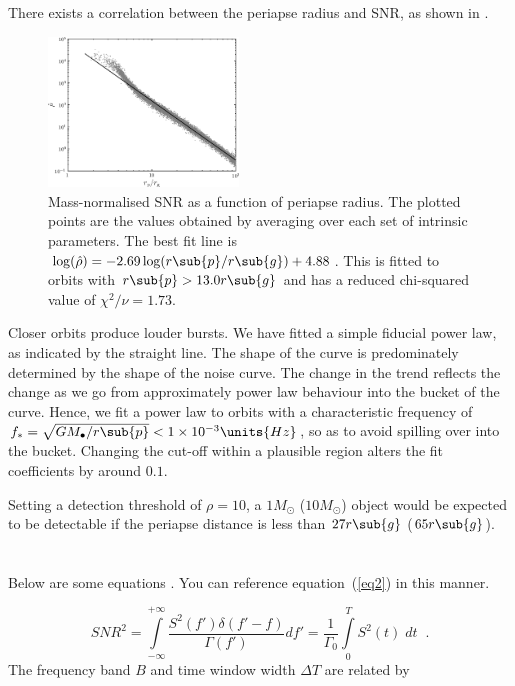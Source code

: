 \documentclass[11pt,twoside]{article}
\begin{document}
\begin{enumerate}
There exists a correlation between the periapse radius and SNR, as shown in .
\begin{figure}
  \begin{center}
  \includegraphics[width=0.45\textwidth]{Fig_SNR}
    \caption{Mass-normalised SNR as a function of periapse radius. The plotted points are the values obtained by averaging over each set of intrinsic parameters. The best fit line is $\log(\hat{\rho}) = -2.69\log(r\sub{p}/r\sub{g}) + 4.88$. This is fitted to orbits with $r\sub{p} >  13.0 r\sub{g}$ and has a reduced chi-squared value of $\chi^2/\nu = 1.73$.}
    \label{fig:SNR}
  \end{center}
\end{figure}
Closer orbits produce louder bursts. We have fitted a simple fiducial power law, as indicated by the straight line. The shape of the curve is predominately determined by the shape of the noise curve. The change in the trend reflects the change as we go from approximately power law behaviour into the bucket of the curve. Hence, we fit a power law to orbits with a characteristic frequency of $f_\ast = \sqrt{GM_\bullet/r\sub{p}} < 1 \times 10^{-3}\units{Hz}$, so as to avoid spilling over into the bucket. Changing the cut-off within a plausible region alters the fit coefficients by around $0.1$.

Setting a detection threshold of $\rho = 10$, a $1 M_\odot$ ($10 M_\odot$) object would be expected to be detectable if the periapse distance is less than $27 r\sub{g}$ ($65 r\sub{g}$).

\section{}

Below are some equations . You can reference equation~(\ref{eq2}) in this manner.

\begin{equation}\label{eq1}
SNR^2  = \int\limits_{ - \infty }^{ + \infty } {\frac{{S^2 (f')\delta (f' - f)}}{{\Gamma (f')}}df' = \frac{1}{{\Gamma _0 }}\int\limits_0^T {S^2 (t)\;dt}}\;\; .
\end{equation}
The frequency band $B$ and time window width $\Delta T$ are related by


\end{enumerate}
\end{document}
